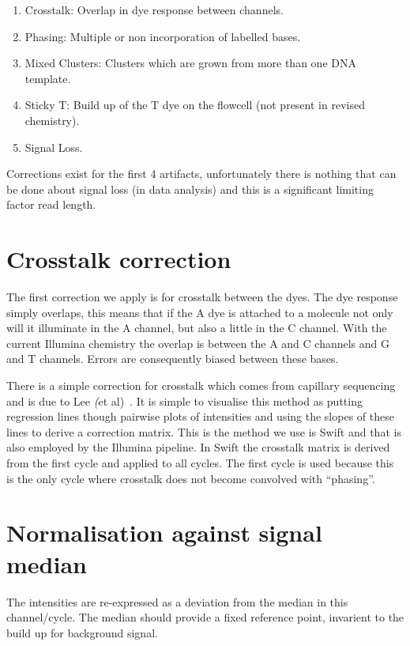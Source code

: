 \documentclass{report}
\begin{document}
\begin{enumerate}
\item Crosstalk: Overlap in dye response between channels.
\item Phasing: Multiple or non incorporation of labelled bases.
\item Mixed Clusters: Clusters which are grown from more than one DNA template.
\item Sticky T: Build up of the T dye on the flowcell (not present in revised chemistry).
\item Signal Loss.
\end{enumerate}

Corrections exist for the first 4 artifacts, unfortunately there is nothing that can be done about signal loss (in data analysis) and this is a significant limiting factor read length.

\section{Crosstalk correction}

The first correction we apply is for crosstalk between the dyes. The dye response simply overlaps, this means that if the A dye is attached to a molecule not only will it illuminate in the A channel, but also a little in the C channel. With the current Illumina chemistry the overlap is between the A and C channels and G and T channels. Errors are consequently biased between these bases.

There is a simple correction for crosstalk which comes from capillary sequencing and is due to Lee \textit(et al)~\cite{lee98}. It is simple to visualise this method as putting regression lines though pairwise plots of intensities and using the slopes of these lines to derive a correction matrix. This is the method we use is Swift and that is also employed by the Illumina pipeline. In Swift the crosstalk matrix is derived from the first cycle and applied to all cycles. The first cycle is used because this is the only cycle where crosstalk does not become convolved with ``phasing''.

\section{Normalisation against signal median}

The intensities are re-expressed as a deviation from the median in this channel/cycle. The median should provide a fixed reference point, invarient to the build up for background signal.
\end{document}

